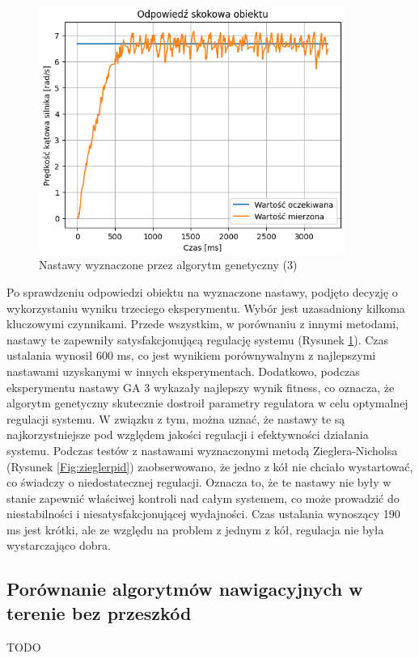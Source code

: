 \documentclass[12pt,twoside]{article}
\begin{document}
\begin{figure}[ht]%
 \centering%
 \includegraphics[width=10cm]{figures/PID/exp3pid.png}%
 \caption{Nastawy wyznaczone przez algorytm genetyczny (3)}%
 \label{Fig:exp3pid}%
\end{figure}

\clearpage

Po sprawdzeniu odpowiedzi obiektu na wyznaczone nastawy, podjęto decyzję o wykorzystaniu wyniku trzeciego eksperymentu. Wybór jest uzasadniony kilkoma kluczowymi czynnikami. Przede wszystkim, w porównaniu z innymi metodami, nastawy te zapewniły satysfakcjonującą regulację systemu (Rysunek \ref{Fig:exp3pid}). Czas ustalania wynosił 600 ms, co jest wynikiem porównywalnym z najlepszymi nastawami uzyskanymi w innych eksperymentach. Dodatkowo, podczas eksperymentu nastawy GA 3 wykazały najlepszy wynik fitness, co oznacza, że algorytm genetyczny skutecznie dostroił parametry regulatora w celu optymalnej regulacji systemu. W związku z tym, można uznać, że nastawy te są najkorzystniejsze pod względem jakości regulacji i efektywności działania systemu. Podczas testów z nastawami wyznaczonymi metodą Zieglera-Nicholsa (Rysunek \ref{Fig:zieglerpid}) zaobserwowano, że jedno z kół nie chciało wystartować, co świadczy o niedostatecznej regulacji. Oznacza to, że te nastawy nie były w stanie zapewnić właściwej kontroli nad całym systemem, co może prowadzić do niestabilności i niesatysfakcjonującej wydajności. Czas ustalania wynoszący 190 ms jest krótki, ale ze względu na problem z jednym z kół, regulacja nie była wystarczająco dobra.



\subsection{Porównanie algorytmów nawigacyjnych w terenie bez przeszkód}
TODO
\end{document}
